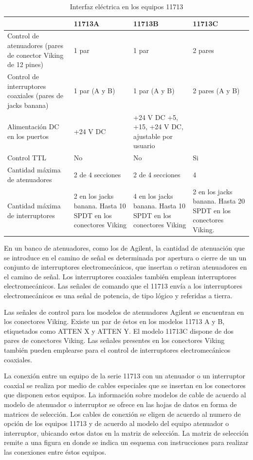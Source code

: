 \begin{table}[h!]
	\begin{tabularx}{\textwidth}{XXXX}
		\toprule
				& 11713A	& 	11713B	&	11713C \\
		\midrule
		Control de atenuadores (pares de conector Viking de 12 pines)	& 1 par & 1 par & 2 pares \\
		\midrule
		Control de interruptores coaxiales (pares de jacks banana)	& 1 par (A y B) & 1 par (A y B) & 2 pares (A y B) \\
		\midrule
		Alimentación DC en los puertos & +24 V DC & +24 V DC +5, +15, +24 V DC, ajustable por usuario \\
		\midrule
		Control TTL & No & No & Si \\
		\midrule
		Cantidad máxima de atenuadores & 2 de 4 secciones & 2 de 4 secciones & 4 \\
		\midrule 
		Cantidad máxima de interruptores & 2 en los jacks banana. Hasta 10 SPDT en los conectores Viking & 4 en los jacks banana. Hasta 10 SPDT en los conectores Viking & 2 en los jacks banana. Hasta 20 SPDT en los conectores Viking. \\
		\bottomrule
	\end{tabularx}
	\caption{Interfaz eléctrica en los equipos 11713}
	\label{Tab:Interfaz eléctrica en los equipos 11713}
\end{table}

En un banco de atenuadores, como los de Agilent, la cantidad de atenuación que se introduce en el camino de señal es determinada por apertura o cierre de un un conjunto de interruptores electromecánicos, que insertan o retiran atenuadores en el camino de señal. Los interruptores coaxiales también emplean interruptores electromecánicos. Las
señales de comando que el 11713 envía a los interruptores electromecánicos es una señal de potencia, de tipo lógico y referidas a tierra.

Las señales de control para los modelos de atenuadores Agilent se encuentran en los conectores Viking. Existe un par de éstos en los modelos 11713 A y B, etiquetados como ATTEN X y ATTEN Y. El modelo 11713C dispone de dos pares de conectores Viking. Las señales presentes en los conectores Viking también pueden emplearse para el control de interruptores electromecánicos coaxiales.

La conexión entre un equipo de la serie 11713 con un atenuador o un interruptor coaxial se realiza por medio de cables especiales que se insertan en los conectores que disponen estos equipos. La información sobre modelos de cable de acuerdo al modelo de atenuador o interruptor se ofrece en las hojas de datos en forma de matrices de selección. Los
cables de conexión se eligen de acuerdo al numero de opción de los equipos 11713 y de acuerdo al modelo del equipo atenuador o interruptor, ubicando estos datos en la matriz de selección. La matriz de selección remite a una figura en donde se indica un esquema con instrucciones para realizar las conexiones entre éstos equipos. 

